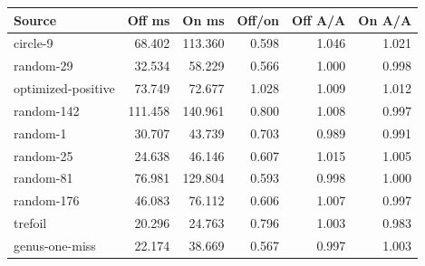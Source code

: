 \begin{tabular}{lrrrrr}
\toprule
Source & Off ms & On ms & Off/on & Off A/A & On A/A \\
\midrule
circle-9 & 68.402 & 113.360 & 0.598 & 1.046 & 1.021 \\
random-29 & 32.534 & 58.229 & 0.566 & 1.000 & 0.998 \\
optimized-positive & 73.749 & 72.677 & 1.028 & 1.009 & 1.012 \\
random-142 & 111.458 & 140.961 & 0.800 & 1.008 & 0.997 \\
random-1 & 30.707 & 43.739 & 0.703 & 0.989 & 0.991 \\
random-25 & 24.638 & 46.146 & 0.607 & 1.015 & 1.005 \\
random-81 & 76.981 & 129.804 & 0.593 & 0.998 & 1.000 \\
random-176 & 46.083 & 76.112 & 0.606 & 1.007 & 0.997 \\
trefoil & 20.296 & 24.763 & 0.796 & 1.003 & 0.983 \\
genus-one-miss & 22.174 & 38.669 & 0.567 & 0.997 & 1.003 \\
\bottomrule
\end{tabular}

